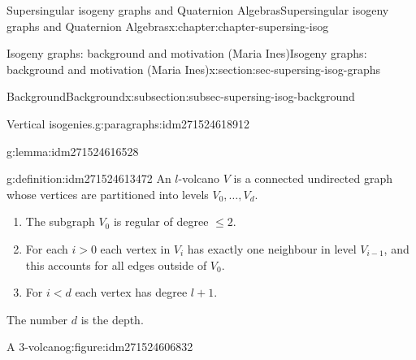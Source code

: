 \documentclass[oneside,10pt,]{book}
\numberwithin{equation}{section}
\newcommand{\lt}{<}
\newcommand{\gt}{>}
\begin{document}
\begin{chapterptx}{Supersingular isogeny graphs and Quaternion Algebras}{}{Supersingular isogeny graphs and Quaternion Algebras}{}{}{x:chapter:chapter-supersing-isog}
\begin{sectionptx}{Isogeny graphs: background and motivation (Maria Ines)}{}{Isogeny graphs: background and motivation (Maria Ines)}{}{}{x:section:sec-supersing-isog-graphs}
\begin{subsectionptx}{Background}{}{Background}{}{}{x:subsection:subsec-supersing-isog-background}
\begin{paragraphs}{Vertical isogenies.}{g:paragraphs:idm271524618912}
\begin{lemma}{}{}{g:lemma:idm271524616528}
\end{lemma}
\begin{definition}{}{g:definition:idm271524613472}%
An \(l\)-volcano \(V\) is a connected undirected graph whose vertices are partitioned into levels \(V_0, \ldots, V_d\).%
\begin{enumerate}
\item{}The subgraph \(V_0\) is regular of degree \(\le 2\).%
\item{}For each \(i \gt 0\) each vertex in \(V_i\) has exactly one neighbour in level \(V_{i-1}\), and this accounts for all edges outside of \(V_0\).%
\item{}For \(i \lt d\) each vertex has degree \(l+1\).%
\end{enumerate}
The number \(d\) is the depth.%
\end{definition}
\begin{figureptx}{A \(3\)-volcano}{g:figure:idm271524606832}{}%
\begin{image}{0}{1}{0}%
\end{image}
\end{figureptx}
\end{paragraphs}
\end{subsectionptx}
\end{sectionptx}
\end{chapterptx}
\end{document}

